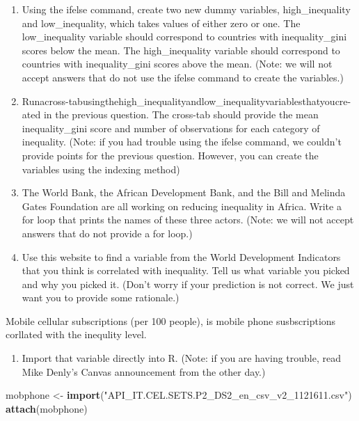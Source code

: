 \documentclass[
]{article}
\newenvironment{Shaded}{\begin{snugshade}}{\end{snugshade}}
\newcommand{\KeywordTok}[1]{\textcolor[rgb]{0.13,0.29,0.53}{\textbf{#1}}}
\newcommand{\NormalTok}[1]{#1}
\newcommand{\StringTok}[1]{\textcolor[rgb]{0.31,0.60,0.02}{#1}}
\providecommand{\tightlist}{%
  \setlength{\itemsep}{0pt}\setlength{\parskip}{0pt}}
\begin{document}
\begin{enumerate}
\def\labelenumi{\arabic{enumi}.}
\setcounter{enumi}{10}
\item
  Using the ifelse command, create two new dummy variables,
  high\_inequality and low\_inequality, which takes values of either
  zero or one. The low\_inequality variable should correspond to
  countries with inequality\_gini scores below the mean. The
  high\_inequality variable should correspond to countries with
  inequality\_gini scores above the mean. (Note: we will not accept
  answers that do not use the ifelse command to create the variables.)
\item
  Runacross-tabusingthehigh\_inequalityandlow\_inequalityvariablesthatyoucre-
  ated in the previous question. The cross-tab should provide the mean
  inequality\_gini score and number of observations for each category of
  inequality. (Note: if you had trouble using the ifelse command, we
  couldn't provide points for the previous question. However, you can
  create the variables using the indexing method)
\item
  The World Bank, the African Development Bank, and the Bill and Melinda
  Gates Foundation are all working on reducing inequality in Africa.
  Write a for loop that prints the names of these three actors. (Note:
  we will not accept answers that do not provide a for loop.)
\item
  Use this website to find a variable from the World Development
  Indicators that you think is correlated with inequality. Tell us what
  variable you picked and why you picked it. (Don't worry if your
  prediction is not correct. We just want you to provide some
  rationale.)
\end{enumerate}

Mobile cellular subscriptions (per 100 people), is mobile phone
susbscriptions corllated with the inequlity level.

\begin{enumerate}
\def\labelenumi{\arabic{enumi}.}
\setcounter{enumi}{14}
\tightlist
\item
  Import that variable directly into R. (Note: if you are having
  trouble, read Mike Denly's Canvas announcement from the other day.)
\end{enumerate}

\begin{Shaded}
\begin{Highlighting}[]
\NormalTok{mobphone <-}\StringTok{ }\KeywordTok{import}\NormalTok{(}\StringTok{"API_IT.CEL.SETS.P2_DS2_en_csv_v2_1121611.csv"}\NormalTok{)}
\KeywordTok{attach}\NormalTok{(mobphone)}
\end{Highlighting}
\end{Shaded}
\end{document}
